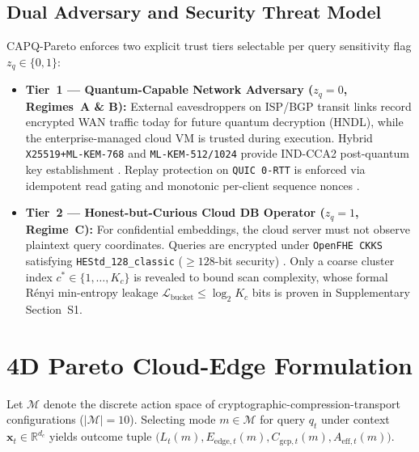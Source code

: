 \documentclass[10pt,journal,compsoc]{IEEEtran}
\begin{document}
\subsection{Dual Adversary and Security Threat Model}
CAPQ-Pareto enforces two explicit trust tiers selectable per query sensitivity flag $z_q \in \{0,1\}$:
\begin{itemize}
    \item \textbf{Tier~1 — Quantum-Capable Network Adversary ($z_q = 0$, Regimes~A \& B):} External eavesdroppers on ISP/BGP transit links record encrypted WAN traffic today for future quantum decryption (HNDL), while the enterprise-managed cloud VM is trusted during execution. Hybrid \texttt{X25519+\allowbreak ML-KEM-768} and \texttt{ML-KEM-512/1024} provide IND-CCA2 post-quantum key establishment \cite{nist_fips203_2024}. Replay protection on \texttt{QUIC 0-RTT} is enforced via idempotent read gating and monotonic per-client sequence nonces \cite{iyengar2021rfc9000}.
    \item \textbf{Tier~2 — Honest-but-Curious Cloud DB Operator ($z_q = 1$, Regime~C):} For confidential embeddings, the cloud server must not observe plaintext query coordinates. Queries are encrypted under \texttt{OpenFHE CKKS} satisfying \texttt{HEStd\_128\_classic} ($\ge 128$-bit security) \cite{cheon2017ckks,albadawi2022openfhe}. Only a coarse cluster index $c^* \in \{1,\dots,K_c\}$ is revealed to bound scan complexity, whose formal R\'enyi min-entropy leakage $\mathcal{L}_{\text{bucket}} \le \log_2 K_c$ bits is proven in Supplementary Section~S1.
\end{itemize}

\section{4D Pareto Cloud-Edge Formulation}\label{sec:math}
Let $\mathcal{M}$ denote the discrete action space of cryptographic-compression-transport configurations ($|\mathcal{M}| = 10$). Selecting mode $m \in \mathcal{M}$ for query $q_t$ under context $\mathbf{x}_t \in \mathbb{R}^{d_c}$ yields outcome tuple $\big(L_t(m), E_{\text{edge},t}(m), C_{\text{gcp},t}(m), A_{\text{eff},t}(m)\big)$.
\end{document}
